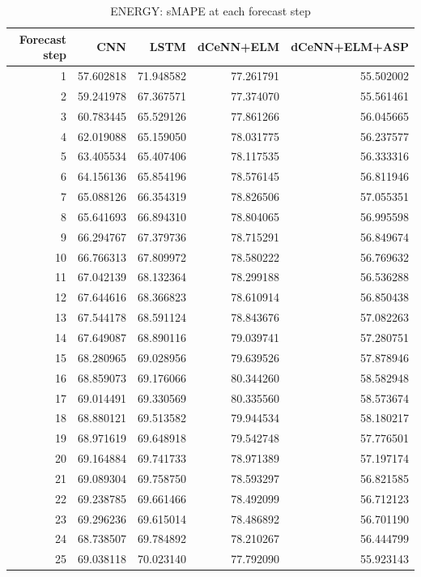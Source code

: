 \begin{table}
\caption{ENERGY: sMAPE at each forecast step}
\begin{tabular}{rrrrr}
\toprule
Forecast step & CNN & LSTM & dCeNN+ELM & dCeNN+ELM+ASP \\
\midrule
1 & 57.602818 & 71.948582 & 77.261791 & 55.502002 \\
2 & 59.241978 & 67.367571 & 77.374070 & 55.561461 \\
3 & 60.783445 & 65.529126 & 77.861266 & 56.045665 \\
4 & 62.019088 & 65.159050 & 78.031775 & 56.237577 \\
5 & 63.405534 & 65.407406 & 78.117535 & 56.333316 \\
6 & 64.156136 & 65.854196 & 78.576145 & 56.811946 \\
7 & 65.088126 & 66.354319 & 78.826506 & 57.055351 \\
8 & 65.641693 & 66.894310 & 78.804065 & 56.995598 \\
9 & 66.294767 & 67.379736 & 78.715291 & 56.849674 \\
10 & 66.766313 & 67.809972 & 78.580222 & 56.769632 \\
11 & 67.042139 & 68.132364 & 78.299188 & 56.536288 \\
12 & 67.644616 & 68.366823 & 78.610914 & 56.850438 \\
13 & 67.544178 & 68.591124 & 78.843676 & 57.082263 \\
14 & 67.649087 & 68.890116 & 79.039741 & 57.280751 \\
15 & 68.280965 & 69.028956 & 79.639526 & 57.878946 \\
16 & 68.859073 & 69.176066 & 80.344260 & 58.582948 \\
17 & 69.014491 & 69.330569 & 80.335560 & 58.573674 \\
18 & 68.880121 & 69.513582 & 79.944534 & 58.180217 \\
19 & 68.971619 & 69.648918 & 79.542748 & 57.776501 \\
20 & 69.164884 & 69.741733 & 78.971389 & 57.197174 \\
21 & 69.089304 & 69.758750 & 78.593297 & 56.821585 \\
22 & 69.238785 & 69.661466 & 78.492099 & 56.712123 \\
23 & 69.296236 & 69.615014 & 78.486892 & 56.701190 \\
24 & 68.738507 & 69.784892 & 78.210267 & 56.444799 \\
25 & 69.038118 & 70.023140 & 77.792090 & 55.923143 \\

\end{tabular}
\end{table}
